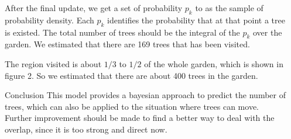 \documentclass[final]{beamer}
\begin{document}
\begin{frame}
\begin{columns}[t]
\begin{column}{\colwidth}
\begin{tcolorbox}[width=\colwidth,height=\contentheight,top=.2in]
\begin{block}{}
\vspace{-0.3in}

After the final update, we get a set of probability $p_k$ to as the sample of probability density. Each $p_k$ identifies the probability that at that point a tree is existed. The total number of trees should be the integral of the $p_k$ over the garden. We estimated that there are 169 trees that has been visited.

\vspace{0.1in}

The region visited is about $1/3$ to $1/2$ of the whole garden, which is shown in figure 2. So we estimated that there are about 400 trees in the garden.

\end{block}

\begin{block}{Conclusion}
This model provides a bayesian approach to predict the number of trees, which can also be applied to the situation where trees can move. Further improvement should be made to find a better way to deal with the overlap, since it is too strong and direct now.
\end{block}


\end{tcolorbox}
\end{column}

\begin{column}{\marginwidth}\end{column} %

\end{columns}

\end{frame}
\end{document}
